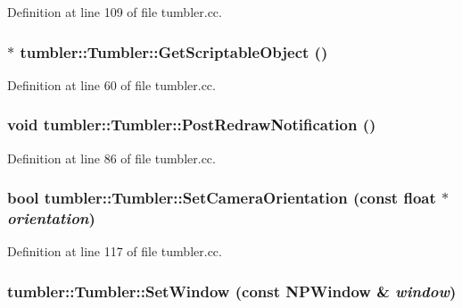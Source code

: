 Definition at line 109 of file tumbler.cc.

\hypertarget{classtumbler_1_1_tumbler_ad438453c62d1edcbdd5cb39a38143a0b}{
\subsubsection[{GetScriptableObject}]{ $\ast$ tumbler::Tumbler::GetScriptableObject ()}}
\label{classtumbler_1_1_tumbler_ad438453c62d1edcbdd5cb39a38143a0b}


Definition at line 60 of file tumbler.cc.

\hypertarget{classtumbler_1_1_tumbler_ab721f5f95ce020ce6680033771ed4577}{
\subsubsection[{PostRedrawNotification}]{\setlength{\rightskip}{0pt plus 5cm}void tumbler::Tumbler::PostRedrawNotification ()}}
\label{classtumbler_1_1_tumbler_ab721f5f95ce020ce6680033771ed4577}


Definition at line 86 of file tumbler.cc.

\hypertarget{classtumbler_1_1_tumbler_a2657d32f15492fc56406d1750172ca8c}{
\subsubsection[{SetCameraOrientation}]{\setlength{\rightskip}{0pt plus 5cm}bool tumbler::Tumbler::SetCameraOrientation (const float $\ast$ {\em orientation})}}
\label{classtumbler_1_1_tumbler_a2657d32f15492fc56406d1750172ca8c}


Definition at line 117 of file tumbler.cc.

\hypertarget{classtumbler_1_1_tumbler_a6aba2f3cfa10be35c0a789924343b1b0}{
\subsubsection[{SetWindow}]{ tumbler::Tumbler::SetWindow (const {\bf NPWindow} \& {\em window})}}
\label{classtumbler_1_1_tumbler_a6aba2f3cfa10be35c0a789924343b1b0}


